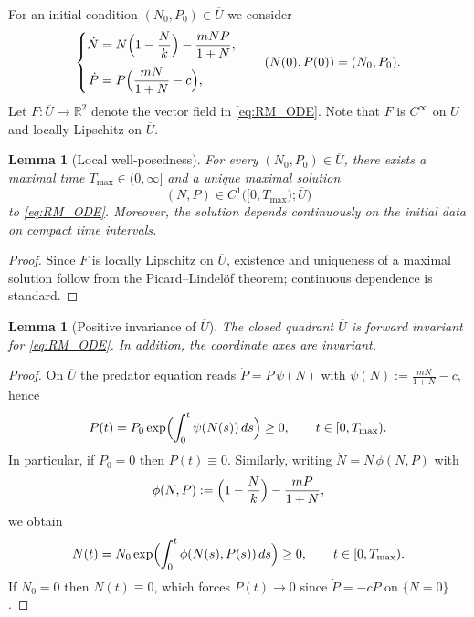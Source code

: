 \documentclass[pdflatex,sn-mathphys-ay]{sn-jnl}
\theoremstyle{thmstyleone}
\newtheorem{lemma}[theorem]{Lemma}
\theoremstyle{definition}
\theoremstyle{remark}
\begin{document}
For an initial condition $(N_0,P_0)\in \overline U$ we consider
\begin{equation}\label{eq:RM_ODE}
\left\{
\begin{aligned}
\dot N &= N\Bigl(1-\frac{N}{k}\Bigr)-\frac{mNP}{1+N},\\[1mm]
\dot P &= P\Bigl(\frac{mN}{1+N}-c\Bigr),
\end{aligned}\right.
\qquad (N(0),P(0))=(N_0,P_0).
\end{equation}
Let $F:\overline U\to\mathbb R^2$ denote the vector field in \eqref{eq:RM_ODE}. Note that $F$ is $C^\infty$ on $U$
and locally Lipschitz on $\overline U$.

\begin{lemma}[Local well-posedness]\label{lem:det_local_wellposed_A}
For every $(N_0,P_0)\in \overline U$, there exists a maximal time $T_{\max}\in(0,\infty]$ and a unique maximal
solution
\[
(N,P)\in C^1\bigl([0,T_{\max});\overline U\bigr)
\]
to \eqref{eq:RM_ODE}. Moreover, the solution depends continuously on the initial data on compact time intervals.
\end{lemma}

\begin{proof}
Since $F$ is locally Lipschitz on $\overline U$, existence and uniqueness of a maximal solution follow from the
Picard--Lindel\"of theorem; continuous dependence is standard.
\end{proof}

\begin{lemma}[Positive invariance of $\overline U$]\label{lem:det_positive_invariance_A}
The closed quadrant $\overline U$ is forward invariant for \eqref{eq:RM_ODE}.
In addition, the coordinate axes are invariant.
\end{lemma}

\begin{proof}
On $\overline U$ the predator equation reads $\dot P = P\,\psi(N)$ with
$\psi(N):=\frac{mN}{1+N}-c$, hence
\[
P(t)=P_0\exp\Bigl(\int_0^t \psi(N(s))\,ds\Bigr)\ge 0,
\qquad t\in[0,T_{\max}).
\]
In particular, if $P_0=0$ then $P(t)\equiv 0$.
Similarly, writing $\dot N = N\,\phi(N,P)$ with
\[
\phi(N,P):=\Bigl(1-\frac{N}{k}\Bigr)-\frac{mP}{1+N},
\]
we obtain
\[
N(t)=N_0\exp\Bigl(\int_0^t \phi(N(s),P(s))\,ds\Bigr)\ge 0,
\qquad t\in[0,T_{\max}).
\]
If $N_0=0$ then $N(t)\equiv 0$, which forces $P(t)\to 0$ since $\dot P=-cP$ on $\{N=0\}$.
\end{proof}

\end{document}
